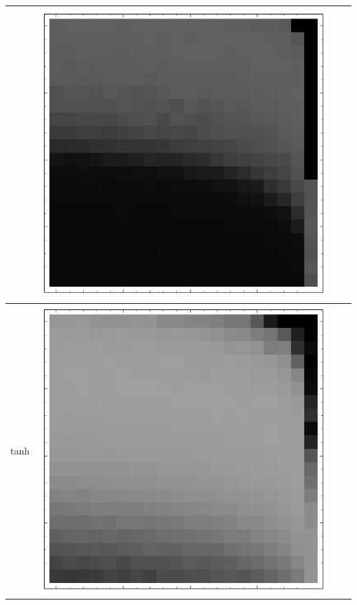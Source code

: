 \documentclass[10pt]{article}
\begin{document}
\begin{tabular}{|c|c|c|c|}
        & \includegraphics[scale=0.25]{plots/simple/LF-40S20S10S-20T10-MNIST-6.png} \\ \hline
tanh
        & \includegraphics[scale=0.25]{plots/simple/LF-20T10T-20T10-MNIST-6.png}

\end{tabular}
\end{document}
